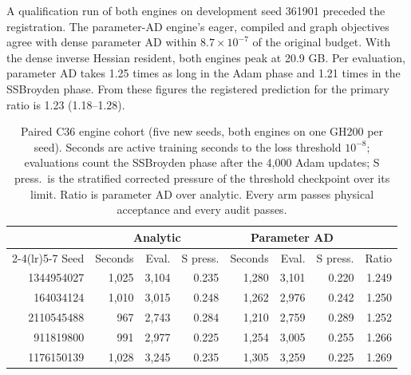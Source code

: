 \documentclass[11pt]{article}
\begin{document}
A qualification run of both engines on development seed 361901 preceded
the registration. The parameter-AD engine's eager, compiled and graph
objectives agree with dense parameter AD within $8.7\times10^{-7}$ of the
original budget. With the dense inverse Hessian resident, both engines
peak at 20.9 GB. Per evaluation, parameter AD takes 1.25 times as long in
the Adam phase and 1.21 times in the SSBroyden phase. From these figures
the registered prediction for the primary ratio is 1.23 (1.18--1.28).

\begin{table}[htbp]\centering\small
\setlength{\tabcolsep}{4pt}
\caption{Paired C36 engine cohort (five new seeds, both engines on one
GH200 per seed). Seconds are active training seconds to the loss
threshold $10^{-8}$; evaluations count the SSBroyden phase after the
4,000 Adam updates; S press.\ is the stratified corrected pressure of the
threshold checkpoint over its limit. Ratio is parameter AD over analytic.
Every arm passes physical acceptance and every audit passes.}
\label{tab:c36pair}
\begin{tabular}{rrrrrrrr}\toprule
 & \multicolumn{3}{c}{Analytic} & \multicolumn{3}{c}{Parameter AD} & \\\cmidrule(lr){2-4}\cmidrule(lr){5-7}
Seed & Seconds & Eval. & S press. & Seconds & Eval. & S press. & Ratio\\\midrule
1344954027 & 1,025 & 3,104 & 0.235 & 1,280 & 3,101 & 0.220 & 1.249\\
164034124 & 1,010 & 3,015 & 0.248 & 1,262 & 2,976 & 0.242 & 1.250\\
2110545488 & 967 & 2,743 & 0.284 & 1,210 & 2,759 & 0.289 & 1.252\\
911819800 & 991 & 2,977 & 0.225 & 1,254 & 3,005 & 0.255 & 1.266\\
1176150139 & 1,028 & 3,245 & 0.235 & 1,305 & 3,259 & 0.225 & 1.269
\\\bottomrule\end{tabular}
\end{table}
\end{document}
